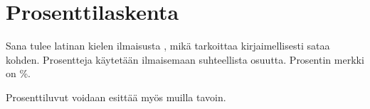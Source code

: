 \section{Prosenttilaskenta}

Sana  tulee latinan kielen ilmaisusta ,
mikä tarkoittaa kirjaimellisesti sataa kohden. 
Prosentteja käytetään ilmaisemaan suhteellista osuutta.
Prosentin merkki on \%.


\begin{esimerkki}
    Prosenttiluvut voidaan esittää myös muilla tavoin.
    \begin{alakohdat}
    \end{alakohdat}
\end{esimerkki}


